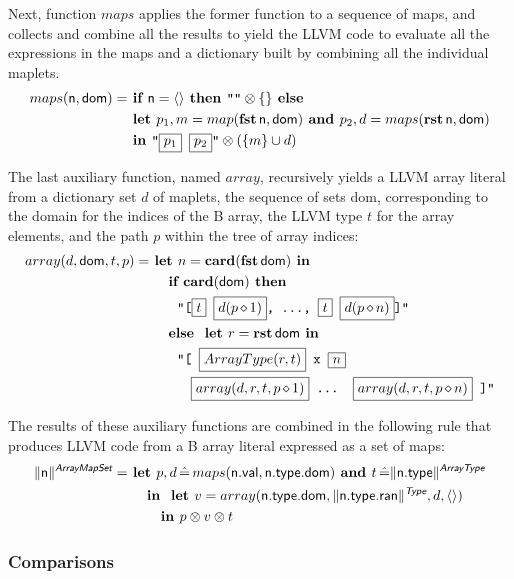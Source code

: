 \documentclass{llncs}
\newcommand{\trad}[2]{\ensuremath{\lVert \textsf{#1} \rVert^{\textit{#2}}}}
\DeclareMathOperator{\conc}{\diamond}
\newcommand{\llvm}[1]{\texttt{#1}}
\newcommand{\B}[1]{\textsf{#1}}
\newcommand{\IF}[0]{\textbf{ if }}
\newcommand{\ELSE}[0]{\textbf{ else }}
\newcommand{\THEN}[0]{\textbf{ then }}
\newcommand{\LET}[0]{\textbf{ let }}
\DeclareMathOperator{\BE}{\hat{=}}
\newcommand{\IN}[0]{\textbf{ in }}
\newcommand{\AND}[0]{\textbf{ and }}
\newcommand{\PH}[1]{\framebox{$#1$}}
\newcommand{\sep}[0]{\otimes}
\begin{document}
Next, function $maps$ applies the former function to a sequence of
maps, and collects and combine all the results to yield the LLVM code
to evaluate all the expressions in the maps and a dictionary built by
combining all the individual maplets.
\begin{align*}
maps(\B{n}, \B{dom}) =& \IF \B{n} = \langle \rangle \THEN \llvm{""} \sep \{\} \ELSE \\
& \LET p_1, m = map(\fst\, \B{n}, \B{dom}) \AND
p_2, d = maps(\rst\, \B{n}, \B{dom}) \\
& \IN \llvm{"\PH{p_1} \PH{p_2}"} \sep (\{ m \} \cup d)
\end{align*}

The last auxiliary function, named $array$, recursively yields a LLVM
array literal from a dictionary set $d$ of maplets, the sequence of
sets \B{dom}, corresponding to the domain for the indices of the B
array, the LLVM type $t$ for the array elements, and the path $p$ within
the tree of array indices:
\begin{align*}
array(d, \B{dom}, t, p) =& 
\LET n = \card(\fst\, \B{dom}) \IN \\
&\quad
\IF \card(\B{dom}) \THEN \\
& \quad \quad
\llvm{"[\PH{t} \PH{d(p \conc 1)}, ..., \PH{t} \PH{d(p \conc n)}]"} \\
&\quad \ELSE \LET r = \rst\, \B{dom} \IN \\
&\quad \quad \llvm{"[ \PH{ArrayType(r, t)} x \PH{n}} \\
&\quad \quad \quad \llvm{\PH{array(d, r, t, p \conc 1)} ... \PH{array(d, r, t, p \conc n)} ]"}
\end{align*}

The results of these auxiliary functions are combined in the following
rule that produces LLVM code from a B array literal expressed as a set
of maps:
\begin{align*}
\trad{n}{\B{ArrayMapSet}} =& 
\LET p, d \BE maps(\B{n.val}, \B{n.type.dom}) \AND
t \BE \trad{n.type}{\B{ArrayType}}\\
& \quad \IN \LET v = array(\B{n.type.dom}, \trad{n.type.ran}{\B{Type}}, d, \langle \rangle) \\
& \quad \quad \IN p \sep v \sep t
\end{align*}

\subsubsection{Comparisons}
\end{document}
